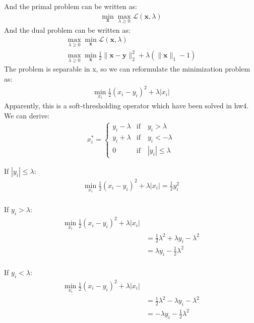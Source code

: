 \documentclass[12pt]{article}
\begin{document}
And the primal problem can be written as:
\begin{align*}
    \min_{\bm{x}} \max_{\lambda \geq 0} \mathcal{L}(\bm{x}, \lambda)
\end{align*}
And the dual problem can be written as:
\begin{align*}
    \max_{\lambda \geq 0} \min_{\bm{x}} \mathcal{L}(\bm{x}, \lambda) \\
    \max_{\lambda \geq 0} \min_{\bm{x}} \frac{1}{2} \|\bm{x} - \bm{y}\|_2^2 + \lambda(\|\bm{x}\|_1 - 1)
\end{align*}
The problem is separable in x, so we can reformulate the minimization problem as:
\begin{align*}
    \min_{x_i} \frac{1}{2} (x_i - y_i)^2 + \lambda|x_i|
\end{align*}
Apparently, this is a soft-thresholding operator which have been solved in hw4. We can derive:
\begin{align*}
    x_i^* = \begin{cases}
        y_i - \lambda &\text{if}\quad y_i > \lambda \\
        y_i + \lambda &\text{if}\quad y_i < -\lambda \\
        0             &\text{if}\quad |y_i| \leq \lambda
    \end{cases}
\end{align*}

If \(|y_i| \leq \lambda\):
\begin{align*}
    \min_{x_i} \frac{1}{2} (x_i - y_i)^2 + \lambda|x_i| = \frac{1}{2} y_i^2 \\
\end{align*}

If \(y_i > \lambda\):
\begin{align*}
    \min_{x_i} \frac{1}{2} (x_i - y_i)^2 + \lambda|x_i|&\\
    &= \frac{1}{2} \lambda^2 + \lambda y_i - \lambda^2  \\
    &= \lambda y_i - \frac{1}{2} \lambda^2\\
\end{align*}


If \(y_i < \lambda\):
\begin{align*}
    \min_{x_i} \frac{1}{2} (x_i - y_i)^2 + \lambda|x_i|&\\
    &= \frac{1}{2} \lambda^2 - \lambda y_i - \lambda^2  \\
    &= -\lambda y_i - \frac{1}{2} \lambda^2\\
\end{align*}
\end{document}
